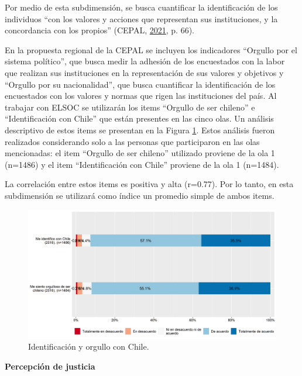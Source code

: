 \documentclass[
  12pt,
]{book}
\begin{document}
Por medio de esta subdimensión, se busca cuantificar la identificación de los individuos ``con los valores y acciones que representan sus instituciones, y la concordancia con los propios'' (CEPAL, \protect\hyperlink{ref-cepal_cohesion_2021}{2021}, p. 66).

En la propuesta regional de la CEPAL se incluyen los indicadores ``Orgullo por el sistema político'', que busca medir la adhesión de los encuestados con la labor que realizan sus instituciones en la representación de sus valores y objetivos y ``Orgullo por su nacionalidad'', que busca cuantificar la identificación de los encuestados con los valores y normas que rigen las instituciones del país. Al trabajar con ELSOC se utilizarán los items ``Orgullo de ser chileno'' e ``Identificación con Chile'' que están presentes en las cinco olas. Un análisis descriptivo de estos items se presentan en la Figura \ref{fig:identificacion}. Estos análisis fueron realizados considerando solo a las personas que participaron en las olas mencionadas: el item ``Orgullo de ser chileno'' utilizado proviene de la ola 1 (n=1486) y el item ``Identificación con Chile'' proviene de la ola 1 (n=1484).

La correlación entre estos items es positiva y alta (r=0.77). Por lo tanto, en esta subdimensión se utilizará como índice un promedio simple de ambos items.

\begin{figure}[H]

{\centering \includegraphics[width=1\linewidth,height=1\textheight]{output/graphs/identificacion} 

}

\caption{Identificación y orgullo con Chile.}\label{fig:identificacion}
\end{figure}

\textbf{Percepción de justicia}
\end{document}
